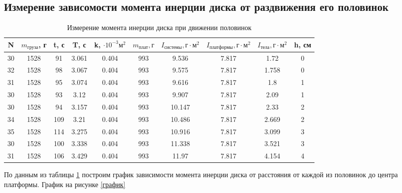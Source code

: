 \documentclass[a4paper,12pt]{article} %
\begin{document}
\subsection{Измерение зависомости момента инерции диска от раздвижения его половинок}
\begin{table} \label{Половинки} \caption{Измерение момента инерции диска при движении половинок} \begin{tabular}{|c|c|c|c|c|c|c|c|c|c|} \hline N & $m_\text{груза}$, г & t, с & T, с & k, $\cdot 10^{-3}\text{м}^2$ & $m_\text{плат}, г$ & $I_\text{системы}, \text{г}\cdot \text{м}^2$ &$I_\text{платформы}, \text{г}\cdot \text{м}^2$ & $I_\text{тела}, \text{г}\cdot \text{м}^2$ & h, см \\ \hline 30 & 1528 & 91 & 3.061 & 0.404 & 993 & 9.536 & 7.817 & 1.72 & 0 \\ \hline 32 & 1528 & 98 & 3.067 & 0.404 & 993 & 9.575 & 7.817 & 1.758 & 0 \\ \hline 31 & 1528 & 95 & 3.074 & 0.404 & 993 & 9.616 & 7.817 & 1.8 & 1 \\ \hline 30 & 1528 & 93 & 3.12 & 0.404 & 993 & 9.907 & 7.817 & 2.09 & 1 \\ \hline 30 & 1528 & 94 & 3.157 & 0.404 & 993 & 10.147 & 7.817 & 2.33 & 2 \\ \hline 34 & 1528 & 109 & 3.21 & 0.404 & 993 & 10.486 & 7.817 & 2.669 & 2 \\ \hline 35 & 1528 & 114 & 3.275 & 0.404 & 993 & 10.916 & 7.817 & 3.099 & 3 \\ \hline 30 & 1528 & 100 & 3.338 & 0.404 & 993 & 11.338 & 7.817 & 3.521 & 3 \\ \hline 31 & 1528 & 106 & 3.429 & 0.404 & 993 & 11.97 & 7.817 & 4.154 & 4 \\ \hline \end{tabular} \end{table}
По данным из таблицы \ref{Половинки} построим график зависимости момента инерции диска от расстояния от каждой из половинок до центра платформы. График на рисунке \ref{график} 
\end{document}
